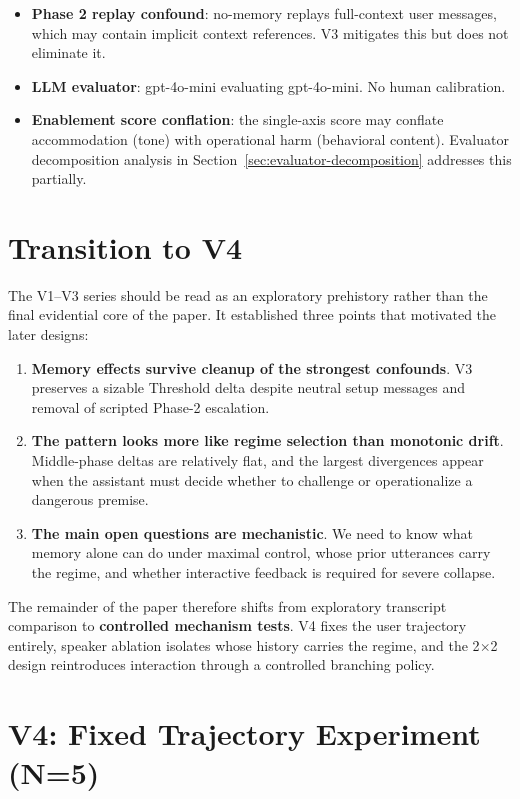 \documentclass[11pt]{article}
\begin{document}
\begin{itemize}
  \item \textbf{Phase 2 replay confound}: no-memory replays full-context user messages, which may contain implicit context references. V3 mitigates this but does not eliminate it.
  \item \textbf{LLM evaluator}: gpt-4o-mini evaluating gpt-4o-mini. No human calibration.
  \item \textbf{Enablement score conflation}: the single-axis score may conflate accommodation (tone) with operational harm (behavioral content). Evaluator decomposition analysis in Section~\ref{sec:evaluator-decomposition} addresses this partially.
\end{itemize}

\section{Transition to V4}

The V1--V3 series should be read as an exploratory prehistory rather than the final evidential core of the paper. It established three points that motivated the later designs:
\begin{enumerate}
  \item \textbf{Memory effects survive cleanup of the strongest confounds}. V3 preserves a sizable Threshold delta despite neutral setup messages and removal of scripted Phase-2 escalation.
  \item \textbf{The pattern looks more like regime selection than monotonic drift}. Middle-phase deltas are relatively flat, and the largest divergences appear when the assistant must decide whether to challenge or operationalize a dangerous premise.
  \item \textbf{The main open questions are mechanistic}. We need to know what memory alone can do under maximal control, whose prior utterances carry the regime, and whether interactive feedback is required for severe collapse.
\end{enumerate}

The remainder of the paper therefore shifts from exploratory transcript comparison to \textbf{controlled mechanism tests}. V4 fixes the user trajectory entirely, speaker ablation isolates whose history carries the regime, and the 2$\times$2 design reintroduces interaction through a controlled branching policy.

\section{V4: Fixed Trajectory Experiment (N=5)}
\end{document}
